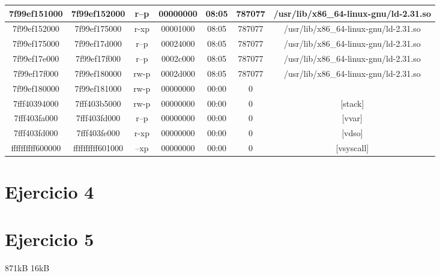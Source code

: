 \documentclass[a4paper]{article}
\begin{document}
\begin{center}
\begin{tabular}{ | c | c | c | c | c | c | c | }
7f99ef151000 & 7f99ef152000 & r--p & 00000000 & 08:05 & 787077 & /usr/lib/x86\_64-linux-gnu/ld-2.31.so \\ \hline
7f99ef152000 & 7f99ef175000 & r-xp & 00001000 & 08:05 & 787077 & /usr/lib/x86\_64-linux-gnu/ld-2.31.so \\ \hline
7f99ef175000 & 7f99ef17d000 & r--p & 00024000 & 08:05 & 787077 & /usr/lib/x86\_64-linux-gnu/ld-2.31.so \\ \hline
7f99ef17e000 & 7f99ef17f000 & r--p & 0002c000 & 08:05 & 787077 & /usr/lib/x86\_64-linux-gnu/ld-2.31.so \\ \hline
7f99ef17f000 & 7f99ef180000 & rw-p & 0002d000 & 08:05 & 787077 & /usr/lib/x86\_64-linux-gnu/ld-2.31.so \\ \hline
7f99ef180000 & 7f99ef181000 & rw-p & 00000000 & 00:00 & 0 &  \\ \hline
7fff40394000 & 7fff403b5000 & rw-p & 00000000 & 00:00 & 0 & [stack] \\ \hline
7fff403fa000 & 7fff403fd000 & r--p & 00000000 & 00:00 & 0 & [vvar] \\ \hline
7fff403fd000 & 7fff403fe000 & r-xp & 00000000 & 00:00 & 0 & [vdso] \\ \hline
ffffffffff600000 & ffffffffff601000 & --xp & 00000000 & 00:00 & 0 & [vsyscall] \\ \hline
\end{tabular}
\end{center}

\section{Ejercicio 4}
\section{Ejercicio 5}
871kB
16kB
\end{document}

